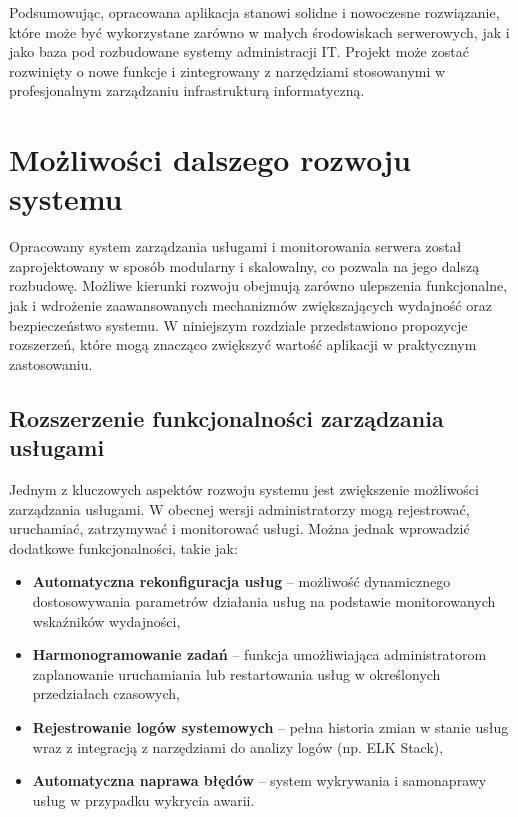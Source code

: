 Podsumowując, opracowana aplikacja stanowi solidne i nowoczesne rozwiązanie, które może być wykorzystane zarówno w małych środowiskach serwerowych, jak i jako baza pod rozbudowane systemy administracji IT. Projekt może zostać rozwinięty o nowe funkcje i zintegrowany z narzędziami stosowanymi w profesjonalnym zarządzaniu infrastrukturą informatyczną.


\section{Możliwości dalszego rozwoju systemu}

Opracowany system zarządzania usługami i monitorowania serwera został zaprojektowany w sposób modularny i skalowalny, co pozwala na jego dalszą rozbudowę. Możliwe kierunki rozwoju obejmują zarówno ulepszenia funkcjonalne, jak i wdrożenie zaawansowanych mechanizmów zwiększających wydajność oraz bezpieczeństwo systemu. W niniejszym rozdziale przedstawiono propozycje rozszerzeń, które mogą znacząco zwiększyć wartość aplikacji w praktycznym zastosowaniu.

\subsection{Rozszerzenie funkcjonalności zarządzania usługami}
Jednym z kluczowych aspektów rozwoju systemu jest zwiększenie możliwości zarządzania usługami. W obecnej wersji administratorzy mogą rejestrować, uruchamiać, zatrzymywać i monitorować usługi. Można jednak wprowadzić dodatkowe funkcjonalności, takie jak:
\begin{itemize}
    \item \textbf{Automatyczna rekonfiguracja usług} – możliwość dynamicznego dostosowywania parametrów działania usług na podstawie monitorowanych wskaźników wydajności,
    \item \textbf{Harmonogramowanie zadań} – funkcja umożliwiająca administratorom zaplanowanie uruchamiania lub restartowania usług w określonych przedziałach czasowych,
    \item \textbf{Rejestrowanie logów systemowych} – pełna historia zmian w stanie usług wraz z integracją z narzędziami do analizy logów (np. ELK Stack),
    \item \textbf{Automatyczna naprawa błędów} – system wykrywania i samonaprawy usług w przypadku wykrycia awarii.
\end{itemize}

